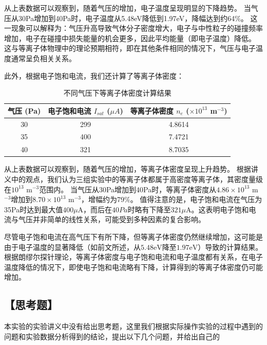 \documentclass[12pt,a4paper,UTF8]{ctexart}
\begin{document}
从上表数据可以观察到，随着气压的增加，电子温度呈现明显的下降趋势。
当气压从30Pa增加到40Pa时，电子温度从5.48eV降低到1.97eV，降幅达到约64$\%$。
这一现象可以解释为：气压升高导致气体分子密度增大，电子与中性粒子的碰撞频率增加，电子在碰撞中损失能量的机会更多，因此平均能量（即电子温度）降低。
这与等离子体物理中的理论预期相符，即在其他条件相同的情况下，气压与电子温度通常呈负相关关系。

此外，根据电子饱和电流，我们还计算了等离子体密度：

\begin{table}[h!]
    \centering
    \caption{不同气压下等离子体密度计算结果}
    \begin{tabular}{|c|c|c|}
        \hline
        \textbf{气压 (Pa)} & \textbf{电子饱和电流 $I_{sat}$ ($\mu A$)} & \textbf{等离子体密度 $n_e$ ($\times 10^{13}$ m$^{-3}$)} \\
        \hline
        30 & 299 & 4.8614 \\
        \hline
        35 & 400 & 7.4721 \\
        \hline
        40 & 321 & 8.7035 \\
        \hline
    \end{tabular}
    \label{tab:plasma_density}
\end{table}

从上表数据可以观察到，随着气压的增加，等离子体密度呈现上升趋势。
根据讲义中的观点，我们认为三组实验中的等离子体都属于高密度等离子体，其密度量级在$10^{13}$ m$^{-3}$范围内。
当气压从30Pa增加到40Pa时，等离子体密度从$4.86 \times 10^{13}$ m$^{-3}$增加到$8.70 \times 10^{13}$ m$^{-3}$，增幅约为79$\%$。
值得注意的是，电子饱和电流在气压为35Pa时达到最大值$400\mu$A，而后在$40Pa$时略有下降至$321\mu$A。这表明电子饱和电流与气压并非简单的线性关系，可能受到多种因素的复合影响。

尽管电子饱和电流在高气压下有所下降，但等离子体密度仍然继续增加，这可能是由于电子温度的显著降低（如前文所述，从$5.48\mathrm{eV}$降至$1.97\mathrm{eV}$）导致的计算结果。
根据朗缪尔探针理论，等离子体密度与电子饱和电流和电子温度都有关系，在电子温度降低的情况下，即使电子饱和电流略有下降，计算得到的等离子体密度仍可能增加。

\subsection*{【思考题】}
本实验的实验讲义中没有给出思考题，这里我们根据实际操作实验的过程中遇到的问题和实验数据分析得到的结论，提出以下几个问题，并给出自己的🤔
\end{document}
